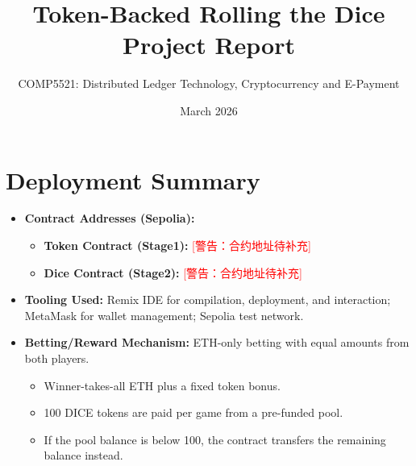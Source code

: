 \documentclass[10pt,a4paper]{article}
\title{Token-Backed Rolling the Dice\\Project Report}
\author{COMP5521: Distributed Ledger Technology, Cryptocurrency and E-Payment}
\date{March 2026}
\newcommand{\missingaddr}{\textcolor{red}{[警告：合约地址待补充]}}
\begin{document}
\maketitle

\section{Deployment Summary}
\begin{itemize}
  \item \textbf{Contract Addresses (Sepolia):}
  \begin{itemize}
    \item \textbf{Token Contract (Stage1):} \missingaddr
    \item \textbf{Dice Contract (Stage2):} \missingaddr
  \end{itemize}
  \item \textbf{Tooling Used:} Remix IDE for compilation, deployment, and interaction; MetaMask for wallet management; Sepolia test network.
  \item \textbf{Betting/Reward Mechanism:} ETH-only betting with equal amounts from both players.
  \begin{itemize}
    \item Winner-takes-all ETH plus a fixed token bonus.
    \item 100 DICE tokens are paid per game from a pre-funded pool.
    \item If the pool balance is below 100, the contract transfers the remaining balance instead.
  \end{itemize}
\end{itemize}
\end{document}
